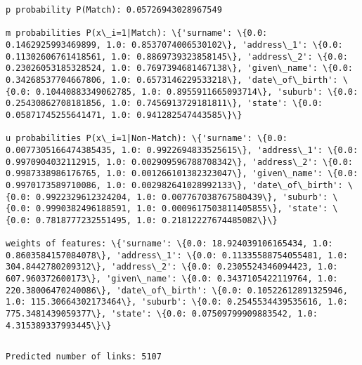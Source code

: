 \documentclass{article}
\begin{document}
    \begin{Verbatim}[commandchars=\\\{\}]
p probability P(Match): 0.05726943028967549

m probabilities P(x\_i=1|Match): \{'surname': \{0.0: 0.1462925993469899, 1.0: 0.8537074006530102\}, 'address\_1': \{0.0: 0.11302606761418561, 1.0: 0.8869739323858145\}, 'address\_2': \{0.0: 0.23026053185328524, 1.0: 0.7697394681467138\}, 'given\_name': \{0.0: 0.34268537704667806, 1.0: 0.6573146229533218\}, 'date\_of\_birth': \{0.0: 0.10440883349062785, 1.0: 0.8955911665093714\}, 'suburb': \{0.0: 0.25430862708181856, 1.0: 0.7456913729181811\}, 'state': \{0.0: 0.05871745255641471, 1.0: 0.941282547443585\}\}

u probabilities P(x\_i=1|Non-Match): \{'surname': \{0.0: 0.0077305166474385435, 1.0: 0.9922694833525615\}, 'address\_1': \{0.0: 0.9970904032112915, 1.0: 0.002909596788708342\}, 'address\_2': \{0.0: 0.9987338986176765, 1.0: 0.001266101382323047\}, 'given\_name': \{0.0: 0.9970173589710086, 1.0: 0.002982641028992133\}, 'date\_of\_birth': \{0.0: 0.9922329612324204, 1.0: 0.007767038767580439\}, 'suburb': \{0.0: 0.9990382496188591, 1.0: 0.0009617503811405855\}, 'state': \{0.0: 0.7818777232551495, 1.0: 0.21812227674485082\}\}

weights of features: \{'surname': \{0.0: 18.924039106165434, 1.0: 0.8603584157084078\}, 'address\_1': \{0.0: 0.11335588754055481, 1.0: 304.8442780209312\}, 'address\_2': \{0.0: 0.2305524346094423, 1.0: 607.960372600173\}, 'given\_name': \{0.0: 0.3437105422119764, 1.0: 220.38006470240086\}, 'date\_of\_birth': \{0.0: 0.10522612891325946, 1.0: 115.30664302173464\}, 'suburb': \{0.0: 0.2545534439535616, 1.0: 775.3481439059377\}, 'state': \{0.0: 0.07509799909883542, 1.0: 4.315389337993445\}\}

    \end{Verbatim}

    \begin{Verbatim}[commandchars=\\\{\}]

\end{Verbatim}

    \begin{Verbatim}[commandchars=\\\{\}]
Predicted number of links: 5107

    \end{Verbatim}
\end{document}
